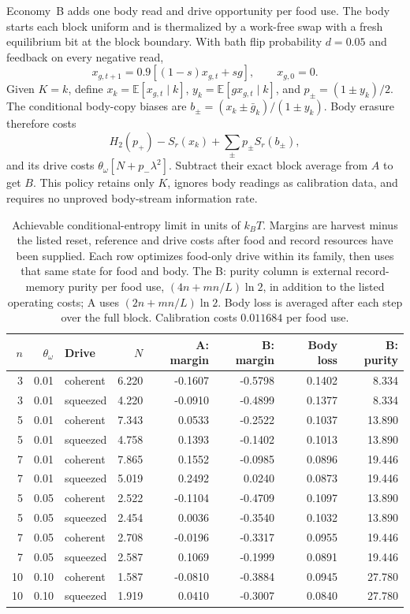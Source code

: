 \documentclass[12pt]{article}
\theoremstyle{definition}
\newcommand{\E}{\mathbb E}
\begin{document}
Economy~B adds one body read and drive opportunity per food use. The body starts each block uniform and is thermalized by a work-free swap with a fresh equilibrium bit at the block boundary. With bath flip probability $d=0.05$ and feedback on every negative read,
\[
x_{g,t+1}=0.9[(1-s)x_{g,t}+sg],\qquad x_{g,0}=0.
\]
Given $K=k$, define $x_k=\E[x_{g,t}\mid k]$, $y_k=\E[gx_{g,t}\mid k]$, and $p_\pm=(1\pm y_k)/2$. The conditional body-copy biases are $b_\pm=(x_k\pm\bar g_k)/(1\pm y_k)$. Body erasure therefore costs
\[
H_2(p_+)-S_r(x_k)+\sum_{\pm}p_\pm S_r(b_\pm),
\]
and its drive costs $\theta_\omega[N+p_-\lambda^2]$. Subtract their exact block average from $A$ to get $B$. This policy retains only $K$, ignores body readings as calibration data, and requires no unproved body-stream information rate.

\begin{table}[t]
\centering\small
\begin{tabular}{@{}rrlrrrrr@{}}
\toprule
$n$ & $\theta_\omega$ & Drive & $N$ & A: margin & B: margin & Body loss & B: purity\\
\midrule
3 & 0.01 & coherent & 6.220 & -0.1607 & -0.5798 & 0.1402 & 8.334 \\
3 & 0.01 & squeezed & 4.220 & -0.0910 & -0.4899 & 0.1377 & 8.334 \\
5 & 0.01 & coherent & 7.343 & 0.0533 & -0.2522 & 0.1037 & 13.890 \\
5 & 0.01 & squeezed & 4.758 & 0.1393 & -0.1402 & 0.1013 & 13.890 \\
7 & 0.01 & coherent & 7.865 & 0.1552 & -0.0985 & 0.0896 & 19.446 \\
7 & 0.01 & squeezed & 5.019 & 0.2492 & 0.0240 & 0.0873 & 19.446 \\
5 & 0.05 & coherent & 2.522 & -0.1104 & -0.4709 & 0.1097 & 13.890 \\
5 & 0.05 & squeezed & 2.454 & 0.0036 & -0.3540 & 0.1032 & 13.890 \\
7 & 0.05 & coherent & 2.708 & -0.0196 & -0.3317 & 0.0955 & 19.446 \\
7 & 0.05 & squeezed & 2.587 & 0.1069 & -0.1999 & 0.0891 & 19.446 \\
10 & 0.10 & coherent & 1.587 & -0.0810 & -0.3884 & 0.0945 & 27.780 \\
10 & 0.10 & squeezed & 1.919 & 0.0410 & -0.3007 & 0.0840 & 27.780 \\
\bottomrule
\end{tabular}
\caption{Achievable conditional-entropy limit in units of $k_BT$. Margins are harvest minus the listed reset, reference and drive costs after food and record resources have been supplied. Each row optimizes food-only drive within its family, then uses that same state for food and body. The B: purity column is external record-memory purity per food use, $(4n+mn/L)\ln2$, in addition to the listed operating costs; A uses $(2n+mn/L)\ln2$. Body loss is averaged after each step over the full block. Calibration costs $0.011684$ per food use.}
\label{tab:viability}
\end{table}
\end{document}
